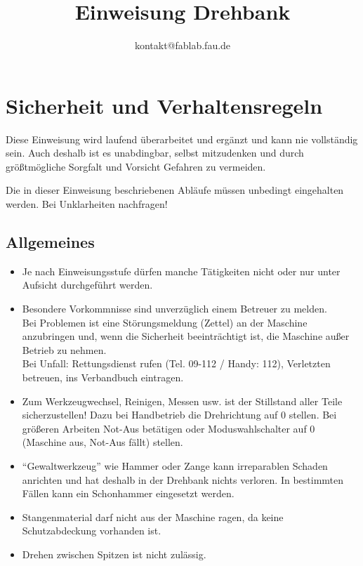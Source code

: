 \documentclass{\basedir/fablab-document}
\author{kontakt@fablab.fau.de}
\title{Einweisung Drehbank}
\begin{document}
\maketitle

\section{Sicherheit und Verhaltensregeln}

Diese Einweisung wird laufend überarbeitet und ergänzt und kann nie vollständig sein. Auch deshalb ist es unabdingbar, selbst mitzudenken und durch größtmögliche Sorgfalt und Vorsicht Gefahren zu vermeiden.

Die in dieser Einweisung beschriebenen Abläufe müssen unbedingt eingehalten werden. Bei Unklarheiten nachfragen!


\subsection{Allgemeines}
\begin{itemize}
	\item Je nach Einweisungsstufe dürfen manche Tätigkeiten nicht oder nur unter Aufsicht durchgeführt werden.
	\item Besondere Vorkommnisse sind unverzüglich einem Betreuer zu melden.\\
Bei Problemen ist eine Störungsmeldung (Zettel) an der Maschine anzubringen und, wenn die Sicherheit beeinträchtigt ist, die Maschine außer Betrieb zu nehmen.\\
Bei Unfall: Rettungsdienst rufen (Tel. 09-112 / Handy: 112), Verletzten betreuen, ins Verbandbuch eintragen.
	\item Zum Werkzeugwechsel, Reinigen, Messen usw. ist der Stillstand aller Teile sicherzustellen! Dazu bei Handbetrieb die Drehrichtung auf 0 stellen. Bei größeren Arbeiten Not-Aus betätigen oder Moduswahlschalter auf 0 (Maschine aus, Not-Aus fällt) stellen.
	\item \enquote{Gewaltwerkzeug} wie Hammer oder Zange kann irreparablen Schaden anrichten und hat deshalb in der Drehbank nichts verloren. In bestimmten Fällen kann ein Schonhammer eingesetzt werden. %
	\item Stangenmaterial darf nicht aus der Maschine ragen, da keine Schutzabdeckung vorhanden ist. %
	\item Drehen zwischen Spitzen ist nicht zulässig. %
\end{itemize}
\end{document}
